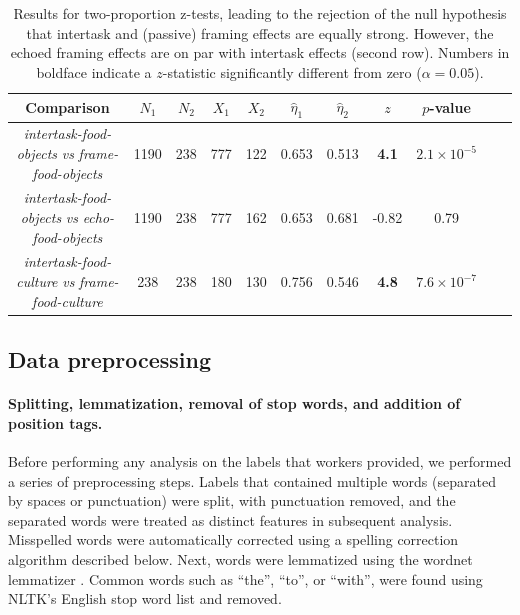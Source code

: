 \documentclass[12pt]{article}
\begin{document}
\begin{table}
\begin{center}
\begin{tabular}{c c c c c c c c c c c }
	\toprule
	Comparison & $N_1$ & $N_2$ & $X_1$ & $X_2$ & $\hat{\eta}_1$ 
		& $\hat{\eta}_2$ & $z$ & $p$-value \\ 
	\midrule
	\parbox[c]{4cm}{\textit{intertask-food-objects} 
	\textit{vs} \textit{frame-food-objects}} & 1190 & 238 & 777 & 122 &
	0.653 & 0.513 & \textbf{4.1} & $2.1 \times 10^{-5}$ \\ 

\noalign{\smallskip}
\hdashline
\noalign{\smallskip}

	\parbox[c]{4cm}{\textit{intertask-food-objects} 
	\textit{vs} \textit{echo-food-objects}} & 1190 & 238 & 777 & 162 
		& 0.653 & 0.681 & -0.82 & 0.79 \\

\noalign{\smallskip}
\hdashline
\noalign{\smallskip}

	\parbox[c]{4cm}{\textit{intertask-food-culture} 
	\textit{vs} \textit{frame-food-culture}} & 238 & 238 & 180 & 130 
	& 0.756 & 0.546 & \textbf{4.8} & $7.6 \times 10^{-7}$ \\
	\bottomrule

\end{tabular}

\caption{
	Results for two-proportion z-tests, leading to the rejection of the null 
	hypothesis that intertask and (passive) framing effects are equally 
	strong.  However, the echoed framing effects are on par with intertask
	effects (second row). 
	Numbers in boldface indicate a $z$-statistic significantly 
	different from zero ($\alpha=0.05$).
}
\label{table:intertask_framing}
\end{center}
\end{table}




\subsection*{Data preprocessing}
	\paragraph{Splitting, lemmatization, removal of stop words, and 
		addition of position tags.} 

	Before performing any analysis on the labels that workers provided, we
	performed a series of preprocessing steps.  
	Labels that contained
	multiple words (separated by spaces or punctuation) were split, with
	punctuation removed, and the separated words were treated as distinct 
	features in subsequent analysis.
	Misspelled words were automatically corrected using a spelling 
	correction algorithm described below.  
	Next, words were lemmatized using the
	wordnet lemmatizer \cite{miller1995wordnet,felbaum1998wordnet}.  
	Common words such as ``the'', ``to'', or ``with'', were found using
	NLTK's English stop word list \cite{loper2002nltk} and removed.
\end{document}
